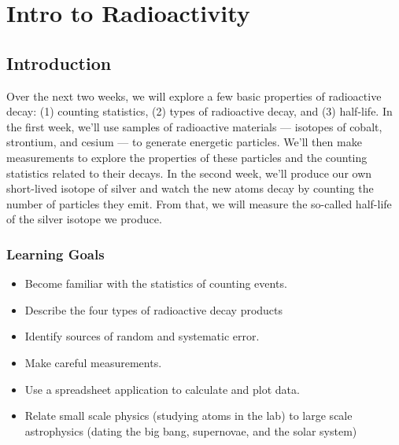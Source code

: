 \chapter{Intro to Radioactivity}



\section{Introduction}

Over the next two weeks, we will explore a few basic properties of radioactive decay: (1) counting statistics, (2) types of radioactive decay, and (3) half-life. In the first week, we'll use samples of radioactive materials --- isotopes of cobalt, strontium, and cesium%
 --- to generate energetic particles. We'll then make measurements to explore the properties of these particles and the counting statistics related to their decays. In the second week, we’ll produce our own short-lived isotope of silver and watch the new atoms decay by counting the number of particles they emit. From that, we will measure the so-called half-life of the silver isotope we produce.

\subsection{Learning Goals}

\begin{itemize}
	\item Become familiar with the statistics of counting events.
	
	\item Describe the four types of radioactive decay products
	
	\item Identify sources of random and systematic error.
	
	\item Make careful measurements.
	
	\item Use a spreadsheet application to calculate and plot data.
	
	\item Relate small scale physics (studying atoms in the lab) to large scale astrophysics (dating the big bang, supernovae, and the solar system)
\end{itemize}

